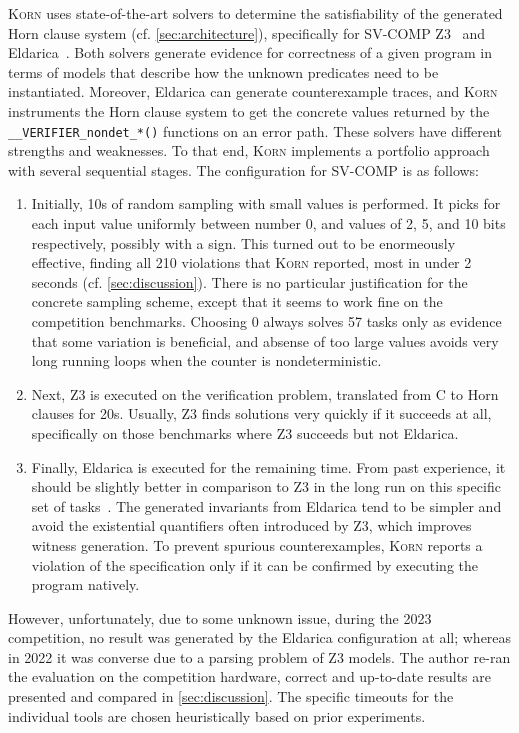 \documentclass{llncs}
\newcommand{\Korn}{\textsc{Korn}\xspace}
\begin{document}
\Korn uses state-of-the-art solvers to determine the satisfiability of the generated Horn clause system (cf. \cref{sec:architecture}),
specifically for SV-COMP Z3~\cite{bjorner2013solving} and Eldarica~\cite{hojjat2018eldarica}.
Both solvers generate evidence for correctness of a given program in terms of models that describe how the unknown predicates need to be instantiated.
Moreover, Eldarica can generate counterexample traces, and \Korn instruments the Horn clause system to get
the concrete values returned by the \texttt{\_\_VERIFIER\_nondet\_*()} functions on an error path.
These solvers have different strengths and weaknesses.
To that end, \Korn implements a portfolio approach with several sequential stages.
The configuration for SV-COMP is as follows:
\begin{enumerate}
    \item Initially, 10s of random sampling with small values is performed.
          It picks for each input value uniformly between number 0, and values of 2, 5, and 10 bits respectively, possibly with a sign.
          This turned out to be enormeously effective,
          finding all 210 violations that \Korn reported, most in under 2 seconds
          (cf. \cref{sec:discussion}).
          There is no particular justification for the concrete sampling scheme,
          except that it seems to work fine on the competition benchmarks.
          Choosing 0 always solves 57 tasks only as evidence that some variation is beneficial,
          and absense of too large values avoids very long running loops
          when the counter is nondeterministic.

    \item Next, Z3 is executed on the verification problem, translated from C to Horn clauses for 20s. Usually, Z3 finds solutions very quickly if it succeeds at all,
          specifically on those benchmarks where Z3 succeeds but not Eldarica.
    \item Finally, Eldarica is executed for the remaining time.
          From past experience, it should be slightly better in comparison to Z3 in the long run on this specific set of tasks~\cite{ernst:arxiv2020:summaries}.
    The generated invariants from Eldarica tend to be simpler and avoid the existential quantifiers
    often introduced by Z3, which improves witness generation.
    To prevent spurious counterexamples,
    \Korn reports a violation of the specification only if it can be confirmed by executing the program natively.
\end{enumerate}
However, unfortunately, due to some unknown issue, during the 2023 competition,
no result was generated by the Eldarica configuration at all;
whereas in 2022 it was converse due to a parsing problem of Z3 models.
The author re-ran the evaluation on the competition hardware,
correct and up-to-date results are presented and compared in \cref{sec:discussion}.
The specific timeouts for the individual tools are chosen heuristically based
on prior experiments.
\end{document}
